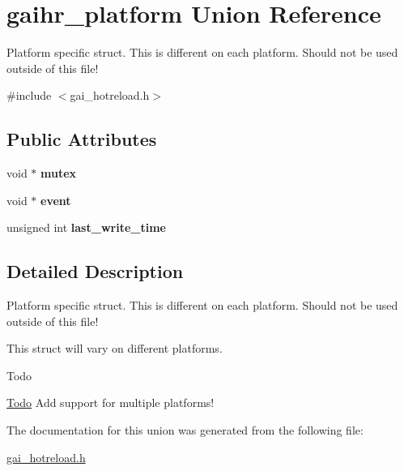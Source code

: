 \hypertarget{uniongaihr__platform}{}\section{gaihr\+\_\+platform Union Reference}
\label{uniongaihr__platform}


Platform specific struct. This is different on each platform. Should not be used outside of this file!  




{\ttfamily \#include $<$gai\+\_\+hotreload.\+h$>$}

\subsection*{Public Attributes}
\begin{DoxyCompactItemize}
\item 
\mbox{\label{uniongaihr__platform_aedfb9de8ef3e57899ffdb423797ee38c}} 
void $\ast$ {\bfseries mutex}
\item 
\mbox{\label{uniongaihr__platform_a632f16efa0c26719b6a05f4fbe4a1de7}} 
void $\ast$ {\bfseries event}
\item 
\mbox{\label{uniongaihr__platform_ad10bbb4f961b70e5d7c9609916bab3b3}} 
unsigned int {\bfseries last\+\_\+write\+\_\+time}
\end{DoxyCompactItemize}


\subsection{Detailed Description}
Platform specific struct. This is different on each platform. Should not be used outside of this file! 

This struct will vary on different platforms. \begin{DoxyRefDesc}{Todo}
\item[\hyperlink{todo__todo000001}{Todo}]Add support for multiple platforms! \end{DoxyRefDesc}


The documentation for this union was generated from the following file\+:\begin{DoxyCompactItemize}
\item 
\hyperlink{gai__hotreload_8h}{gai\+\_\+hotreload.\+h}\end{DoxyCompactItemize}

